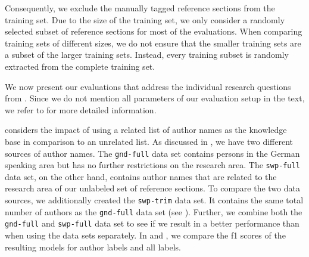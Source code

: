 %
Consequently, we exclude the manually tagged reference sections from the training set.
Due to the size of the training set, we only consider a randomly selected subset of reference sections for most of the evaluations.
When comparing training sets of different sizes, we do not ensure that the smaller training sets are a subset of the larger training sets.
Instead, every training subset is randomly extracted from the complete training set.

We now present our evaluations that address the individual research questions from .
Since we do not mention all parameters of our evaluation setup in the text, we refer to  for more detailed information.

\bigskip

 considers the impact of using a related list of author names as the knowledge base in comparison to an unrelated list.
As discussed in , we have two different sources of author names.
The \texttt{gnd-full} data set contains persons in the German speaking area but has no further restrictions on the research area.
The \texttt{swp-full} data set, on the other hand, contains author names that are related to the research area of our unlabeled set of reference sections.
To compare the two data sources, we additionally created the \texttt{swp-trim} data set.
It contains the same total number of authors as the \texttt{gnd-full} data set (see ).
Further, we combine both the \texttt{gnd-full} and \texttt{swp-full} data set to see if we result in a better performance than when using the data sets separately.
In  and , we compare the \glspl{f1 score} of the resulting models for author labels and all labels.
